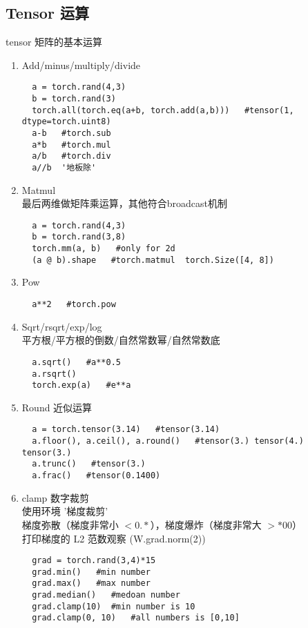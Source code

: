 \subsection{Tensor 运算}
tensor 矩阵的基本运算
\begin{enumerate}
  \item Add/minus/multiply/divide
  \begin{lstlisting}
  a = torch.rand(4,3)
  b = torch.rand(3)
  torch.all(torch.eq(a+b, torch.add(a,b)))   #tensor(1, dtype=torch.uint8)
  a-b   #torch.sub
  a*b   #torch.mul
  a/b   #torch.div
  a//b  '地板除'
  \end{lstlisting}
  \item Matmul   \\最后两维做矩阵乘运算，其他符合broadcast机制
  \begin{lstlisting}
  a = torch.rand(4,3)
  b = torch.rand(3,8)
  torch.mm(a, b)   #only for 2d
  (a @ b).shape   #torch.matmul  torch.Size([4, 8])
  \end{lstlisting}
  \item Pow
  \begin{lstlisting}
  a**2   #torch.pow
  \end{lstlisting}
  \item Sqrt/rsqrt/exp/log \\平方根/平方根的倒数/自然常数幂/自然常数底
  \begin{lstlisting}
  a.sqrt()   #a**0.5
  a.rsqrt()
  torch.exp(a)   #e**a
  \end{lstlisting}
  \item Round 近似运算
  \begin{lstlisting}
  a = torch.tensor(3.14)   #tensor(3.14)
  a.floor(), a.ceil(), a.round()   #tensor(3.) tensor(4.) tensor(3.)
  a.trunc()   #tensor(3.)
  a.frac()   #tensor(0.1400)
  \end{lstlisting}
  \item clamp 数字裁剪  \\
  使用环境   '梯度裁剪'\\ 梯度弥散（梯度非常小 $<0.*$），梯度爆炸（梯度非常大 $>*00$）\\
  打印梯度的 L2 范数观察  (W.grad.norm(2))\\
  \begin{lstlisting}
  grad = torch.rand(3,4)*15
  grad.min()   #min number
  grad.max()   #max number
  grad.median()   #medoan number
  grad.clamp(10)  #min number is 10
  grad.clamp(0, 10)   #all numbers is [0,10]
  \end{lstlisting}
\end{enumerate}

